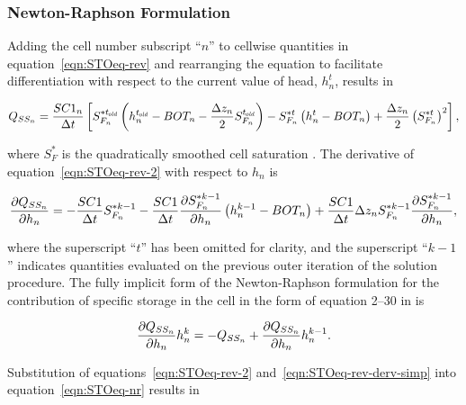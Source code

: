 \subsubsection{Newton-Raphson Formulation}

Adding the cell number subscript ``$n$'' to cellwise quantities in equation~\ref{eqn:STOeq-rev} and rearranging the equation to facilitate differentiation with respect to the current value of head, $h_n^t$, results in

\begin{equation}
	\label{eqn:STOeq-rev-2}
	Q_{SS_n} = \frac{SC1_n}{\Delta t} \left[S_{F_n}^{\ast t_\mathit{\kern -0.07em old}} \left( h_n^{t_\mathit{\kern -0.07em old}} - BOT_n - \frac{\Delta z_n}{2} S_{F_n}^{t_\mathit{\kern -0.07em old}} \right) -S_{F_n}^{\ast t} \left( h_n^t - BOT_n \right) + \frac{\Delta z_n}{2} \left( S_{F_n}^{\ast t} \right)^2 \right] ,
\end{equation}

\noindent where $S_F^\ast$ is the quadratically smoothed cell saturation \citep[see][Eq.~4--5]{modflow6gwf}. The derivative of equation~\ref{eqn:STOeq-rev-2} with respect to $h_n$ is 

\begin{equation}
	\label{eqn:STOeq-rev-derv-simp}
	\frac{\partial Q_{SS_n}}{\partial h_n} = -\frac{SC1}{\Delta t} S_{F_n}^{\ast k-1} - \frac{SC1}{\Delta t} \frac{\partial S_{F_n}^{\ast k-1}}{\partial h_n} \left( h_n^{k-1} - BOT_n \right) + \frac{SC1}{\Delta t} \Delta z_n S_{F_n}^{\ast k-1}  \frac{\partial S_{F_n}^{\ast k-1}}{\partial h_n} ,
\end{equation}

\noindent where the superscript ``$t$'' has been omitted for clarity, and the superscript ``$k-1$'' indicates quantities evaluated on the previous outer iteration of the solution procedure. The fully implicit form of the Newton-Raphson formulation for the contribution of specific storage in the cell in the form of equation 2--30 in \cite{modflow6gwf} is

\begin{equation}
	\label{eqn:STOeq-nr}
	\frac{\partial Q_{SS_n}}{\partial h_n} h_n^k = -Q_{SS_n} + \frac{\partial Q_{SS_n}}{\partial h_n} h_n^{k-1} .
\end{equation}

\noindent Substitution of equations~\ref{eqn:STOeq-rev-2} and~\ref{eqn:STOeq-rev-derv-simp} into equation~\ref{eqn:STOeq-nr}  results in

